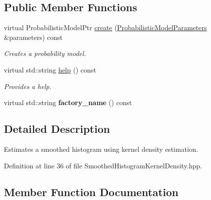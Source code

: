\subsection*{Public Member Functions}
\begin{DoxyCompactItemize}
\item 
virtual Probabilistic\+Model\+Ptr \hyperlink{classtops_1_1SmoothedHistogramKernelDensity_a4d3c3a63d0810ef133a14855fd937a8e}{create} (\hyperlink{classtops_1_1ProbabilisticModelParameters}{Probabilistic\+Model\+Parameters} \&parameters) const
\begin{DoxyCompactList}\small\item\em Creates a probability model. \end{DoxyCompactList}\item 
\mbox{\label{classtops_1_1SmoothedHistogramKernelDensity_aab81791e09e0fac51cf4750258fdc161}} 
virtual std\+::string \hyperlink{classtops_1_1SmoothedHistogramKernelDensity_aab81791e09e0fac51cf4750258fdc161}{help} () const
\begin{DoxyCompactList}\small\item\em Provides a help. \end{DoxyCompactList}\item 
\mbox{\label{classtops_1_1SmoothedHistogramKernelDensity_a66ba590123f92be087eb6a51412d512d}} 
virtual std\+::string {\bfseries factory\+\_\+name} () const
\end{DoxyCompactItemize}


\subsection{Detailed Description}
Estimates a smoothed histogram using kernel density estimation. 

Definition at line 36 of file Smoothed\+Histogram\+Kernel\+Density.\+hpp.



\subsection{Member Function Documentation}
\mbox{\label{classtops_1_1SmoothedHistogramKernelDensity_a4d3c3a63d0810ef133a14855fd937a8e}} 
